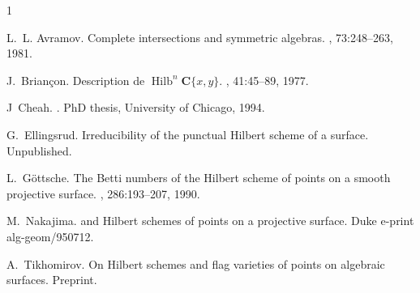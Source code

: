 \documentclass[12pt]{amsart}
\def\CC{{\mathbf C}}
\def\Hilb{\operatorname{Hilb}}
\theoremstyle{definition}
\theoremstyle{remark}
\numberwithin{equation}{section}
\begin{document}
%
\begin{thebibliography}{1}

L.~L. Avramov.
\newblock Complete intersections and symmetric algebras.
, 73:248--263, 1981.

J.~{Brian\c con}.
\newblock Description de {$\Hilb^n\CC\{x,y\}$}.
, 41:45--89, 1977.

J~Cheah.
.
\newblock PhD thesis, University of Chicago, 1994.

G.~Ellingsrud.
\newblock Irreducibility of the punctual {Hilbert} scheme of a surface.
\newblock Unpublished.

L.~G\"ottsche.
\newblock The {Betti} numbers of the {Hilbert} scheme of points on a smooth
  projective surface.
, 286:193--207, 1990.

M.~Nakajima.
 and {Hilbert} schemes of points on a projective
  surface.
\newblock Duke e-print alg-geom/950712.

A.~Tikhomirov.
\newblock On {Hilbert} schemes and flag varieties of points on algebraic
  surfaces.
\newblock Preprint.

\end{thebibliography}
\end{document}
